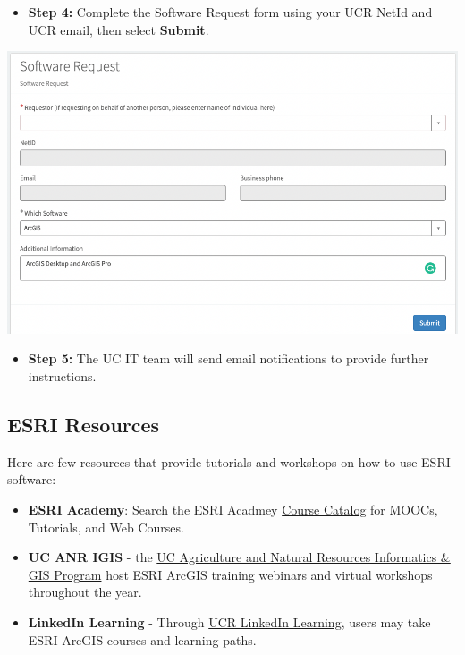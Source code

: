 \documentclass[
]{book}
\providecommand{\tightlist}{%
  \setlength{\itemsep}{0pt}\setlength{\parskip}{0pt}}
\begin{document}
\begin{itemize}
\tightlist
\item
  \textbf{Step 4:} Complete the Software Request form using your UCR NetId and UCR email, then select \textbf{Submit}.
\end{itemize}

\begin{center}\includegraphics[width=0.75\linewidth]{images/requestsubmit} \end{center}

\begin{itemize}
\tightlist
\item
  \textbf{Step 5:} The UC IT team will send email notifications to provide further instructions.
\end{itemize}

\hypertarget{esri-resources}{%
\subsection{ESRI Resources}\label{esri-resources}}

Here are few resources that provide tutorials and workshops on how to use ESRI software:

\begin{itemize}
\tightlist
\item
  \textbf{ESRI Academy}: Search the ESRI Acadmey \href{https://www.esri.com/training/}{Course Catalog} for MOOCs, Tutorials, and Web Courses.
\item
  \textbf{UC ANR IGIS} - the \href{https://igis.ucanr.edu/Training/}{UC Agriculture and Natural Resources Informatics \& GIS Program} host ESRI ArcGIS training webinars and virtual workshops throughout the year.
\item
  \textbf{LinkedIn Learning} - Through \href{https://www.linkedin.com/learning/topics/arcgis?u=26135898}{UCR LinkedIn Learning}, users may take ESRI ArcGIS courses and learning paths.
\end{itemize}
\end{document}
